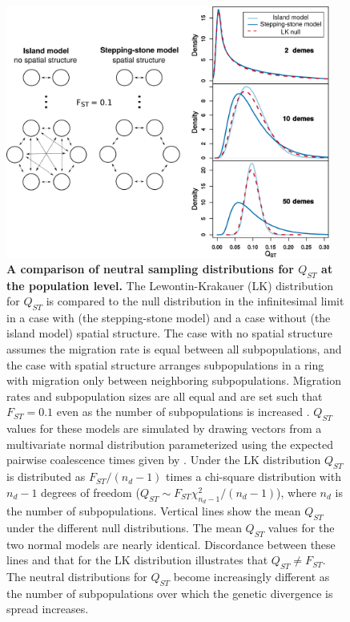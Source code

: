 \begin{figure}
  \centering
  \includegraphics[width=0.95\textwidth]{./figures/pop_struct_combine_alt.pdf}
  \caption{ \textbf{A comparison of neutral sampling distributions for
      $Q_{ST}$ at the population level.} The Lewontin-Krakauer (LK) distribution for $Q_{ST}$ is
    compared to the null distribution in the infinitesimal limit in a case with
    (the stepping-stone model) and a case without (the island model) spatial
    structure. The case with no spatial structure assumes the migration rate is
    equal between all subpopulations, and the case with spatial structure
    arranges subpopulations in a ring with migration only between neighboring
    subpopulations. Migration rates and subpopulation sizes are all equal and
    are set such that $F_{ST}=0.1$ even as the number of subpopulations is
    increased \citep{Slatkin1991}. $Q_{ST}$ values for these models are
    simulated by drawing vectors from a multivariate normal distribution
    parameterized using the expected pairwise coalescence times given by
    \citep{Slatkin1991}. Under the LK distribution $Q_{ST}$ is distributed as
    $F_{ST}/(n_d - 1)$ times a chi-square distribution with $n_d - 1$ degrees of
    freedom ($Q_{ST}\sim F_{ST}\chi^2_{n_d - 1}/(n_d-1)$), where $n_d$ is the
    number of subpopulations. Vertical lines show the mean $Q_{ST}$ under the
    different null distributions. The mean $Q_{ST}$ values for the two normal
    models are nearly identical. Discordance between these lines and that for
    the LK distribution illustrates that $Q_{ST} \neq F_{ST}$. The neutral
    distributions for $Q_{ST}$ become increasingly different as the number of
    subpopulations over which the genetic divergence is spread increases.}
  \label{fig:qst_deme}
\end{figure}

